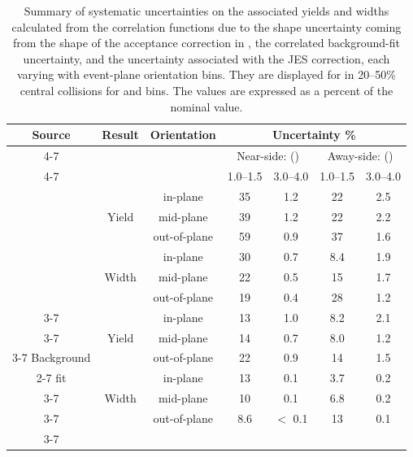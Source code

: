\begin{table}[!htbp]
	\caption[Orientation-dependent systematic uncertainties for 20--40~GeV/\(c\) jets]{Summary of systematic uncertainties on the associated yields and widths calculated from the correlation functions due to the shape uncertainty coming from the shape of the acceptance correction in \deta, the correlated background-fit uncertainty, and the uncertainty associated with the JES correction, each varying with event-plane orientation bins.  They are displayed for  in 20--50\% central \AuAu collisions for  and  bins.  The values are expressed as a percent of the nominal value. }
	\label{Tab:SystematicSummaryEPdep2040}
	\centering
	\small
	\setlength{\tabcolsep}{4pt}
	\begin{tabular}{c | c | c | c | c | c | c}\hline
		\multirow{3}{*}{Source} & \multirow{3}{*}{Result} & \multirow{3}{*}{Orientation} & \multicolumn{4}{c}{Uncertainty \%} \\ \cline{4-7}
		&   &      & \multicolumn{2}{c|}{Near-side: \Pt{assoc} (\GeVc)} & \multicolumn{2}{c}{Away-side: \Pt{assoc} (\GeVc)} \Bstrut \\ \cline{4-7}     
		&   &      & 1.0--1.5 & 3.0--4.0 & 1.0--1.5 & 3.0--4.0 \\ \hline           
		
		\multirow{6}{*}{} & \multirow{3}{*}{Yield} & in-plane & 35 & 1.2 & 22 & 2.5  \\ \cline{3-7}
		& & mid-plane & 39 & 1.2 & 22 & 2.2 \\ \cline{3-7}
		Acceptance & & out-of-plane & 59 & 0.9 & 37 & 1.6 \\ \cline{2-7}
		shape & \multirow{3}{*}{Width} & in-plane & 30 & 0.7 & 8.4 & 1.9 \\ \cline{3-7}
		& & mid-plane    & 22 & 0.5 & 15  & 1.7 \\ \cline{3-7}
		& & out-of-plane & 19 & 0.4 & 28  & 1.2 \\ \cline{3-7}
		\hline
		
		\multirow{6}{*}{} & \multirow{3}{*}{Yield} & in-plane & 13 & 1.0 & 8.2 & 2.1 \\ \cline{3-7}
		& & mid-plane & 14 & 0.7 & 8.0 & 1.2 \\ \cline{3-7}
		Background & & out-of-plane & 22 & 0.9 & 14 & 1.5  \\ \cline{2-7}
		fit & \multirow{3}{*}{Width} & in-plane & 13 & 0.1 & 3.7 & 0.2 \\ \cline{3-7}
		& & mid-plane    & 10  & 0.1 & 6.8 & 0.2 \\ \cline{3-7}
		& & out-of-plane & 8.6 & $<$ 0.1 & 13  & 0.1 \\ \cline{3-7}
		\hline
		

\end{tabular}
\end{table}
